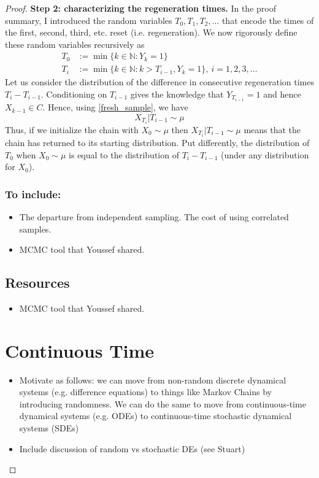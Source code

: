 \documentclass[12pt]{article}
\begin{document}
\begin{proof}
\bigskip
\noindent
\textbf{Step 2: characterizing the regeneration times.} In the proof summary, I introduced the random variables $T_0, T_1, T_2, \dots$ that encode the times of the first, second, third, etc. 
reset (i.e. regeneration). We now rigorously define these random variables recursively as 
\begin{align*}
T_0 &:= \min\{k \in \mathbb{N}: Y_k = 1\} \\
 T_i &:= \min\{k \in \mathbb{N}: k > T_{i - 1}, Y_k = 1\}, \ i = 1, 2, 3, \dots
\end{align*}
Let us consider the distribution of the difference in consecutive regeneration times $T_{i} - T_{i-1}$. Conditioning on $T_{i-1}$ gives the knowledge that $Y_{T_{i-1}} = 1$ and hence 
$X_{k-1} \in C$. Hence, using \ref{fresh_sample}, we have 
\[X_{T_i} | T_{i - 1} \sim \mu\]
Thus, if we initialize the chain with $X_0 \sim \mu$ then $X_{T_i} | T_{i - 1} \sim \mu$ means that the chain has returned to its starting distribution. Put differently, the distribution of 
$T_0$ when $X_0 \sim \mu$ is equal to the distribution of $T_i - T_{i - 1}$ (under any distribution for $X_0$). 



\subsubsection{To include:}
\begin{itemize}
\item The departure from independent sampling. The cost of using correlated samples. 
\item MCMC tool that Youssef shared. 
\end{itemize}

\subsection{Resources}
\begin{itemize}
\item MCMC tool that Youssef shared. 
\end{itemize}









\section{Continuous Time}
\begin{itemize}
\item Motivate as follows: we can move from non-random discrete dynamical systems (e.g. difference equations) to things like Markov Chains by introducing randomness. We can do the 
same to move from continuous-time dynamical systems (e.g. ODEs) to continuous-time stochastic dynamical systems (SDEs) 
\item Include discussion of random vs stochastic DEs (see Stuart)
\end{itemize}


\end{proof}
\end{document}
